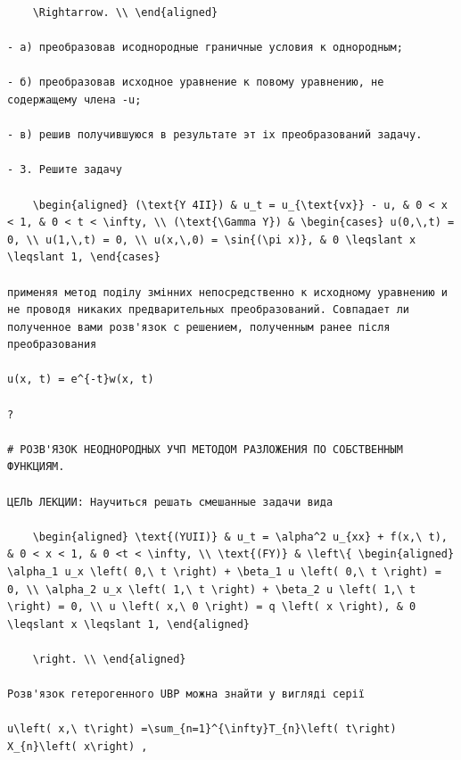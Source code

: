 \documentclass[
  ukrainian,
]{article}
\begin{document}
\begin{verbatim}
    \Rightarrow. \\ \end{aligned}

- а) преобразовав исоднородные граничные условия к однородным;

- б) преобразовав исходное уравнение к повому уравнению, не содержащему члена -u;

- в) решив получившуюся в результате эт іх преобразований задачу.

- 3. Решите задачу

    \begin{aligned} (\text{Y 4II}) & u_t = u_{\text{vx}} - u, & 0 < x < 1, & 0 < t < \infty, \\ (\text{\Gamma Y}) & \begin{cases} u(0,\,t) = 0, \\ u(1,\,t) = 0, \\ u(x,\,0) = \sin{(\pi x)}, & 0 \leqslant x \leqslant 1, \end{cases}

применяя метод поділу змінних непосредственно к исходному уравнению и не проводя никаких предварительных преобразований. Совпадает ли полученное вами розв'язок с решением, полученным ранее після преобразования

u(x, t) = e^{-t}w(x, t)

?

# РОЗВ'ЯЗОК НЕОДНОРОДНЫХ УЧП МЕТОДОМ РАЗЛОЖЕНИЯ ПО СОБСТВЕННЫМ ФУНКЦИЯМ.

ЦЕЛЬ ЛЕКЦИИ: Научиться решать смешанные задачи вида

    \begin{aligned} \text{(YUII)} & u_t = \alpha^2 u_{xx} + f(x,\ t), & 0 < x < 1, & 0 <t < \infty, \\ \text{(FY)} & \left\{ \begin{aligned} \alpha_1 u_x \left( 0,\ t \right) + \beta_1 u \left( 0,\ t \right) = 0, \\ \alpha_2 u_x \left( 1,\ t \right) + \beta_2 u \left( 1,\ t \right) = 0, \\ u \left( x,\ 0 \right) = q \left( x \right), & 0 \leqslant x \leqslant 1, \end{aligned}

    \right. \\ \end{aligned}

Розв'язок гетерогенного UBP можна знайти у вигляді серії

u\left( x,\ t\right) =\sum_{n=1}^{\infty}T_{n}\left( t\right) X_{n}\left( x\right) ,


\end{verbatim}
\end{document}
